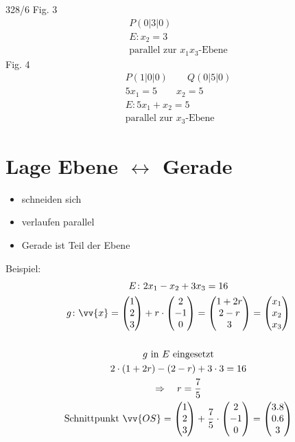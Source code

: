 \begin{exercise}{328/6}
  Fig. 3
  \begin{gather*}
    P(0|3|0) \\
    E \colon x_2 = 3 \\
    \text{parallel zur $x_1x_3$-Ebene}
  \end{gather*}
  Fig. 4
  \begin{gather*}
    P(1|0|0) \qquad Q(0|5|0) \\
    5x_1 = 5 \qquad x_2 = 5 \\
    E \colon 5x_1 + x_2 = 5 \\
    \text{parallel zur $x_3$-Ebene}
  \end{gather*}
\end{exercise}
\section{Lage Ebene $\leftrightarrow$ Gerade}
\begin{itemize}
  \item schneiden sich
  \item verlaufen parallel
  \item Gerade ist Teil der Ebene
\end{itemize}
Beispiel:
\begin{gather*}
  E \colon 2x_1 - x_2 + 3x_3 = 16 \\
  g \colon \vv{x} = \begin{pmatrix}1 \\ 2 \\ 3\end{pmatrix} + r \cdot \begin{pmatrix}2 \\ -1 \\ 0\end{pmatrix} = \begin{pmatrix}1 + 2r \\ 2 - r \\ 3\end{pmatrix} = \begin{pmatrix}x_1 \\ x_2 \\ x_3\end{pmatrix} \\\\
  \text{$g$ in $E$ eingesetzt} \\
  2 \cdot (1 + 2r) - (2 - r) + 3 \cdot 3 = 16 \\
  \Rightarrow\quad r = \frac{7}{5} \\
  \text{Schnittpunkt } \vv{OS} = \begin{pmatrix}1 \\ 2 \\ 3\end{pmatrix} + \frac{7}{5} \cdot \begin{pmatrix}2 \\ -1 \\ 0\end{pmatrix} = \begin{pmatrix}3.8 \\ 0.6 \\ 3\end{pmatrix}
\end{gather*}
